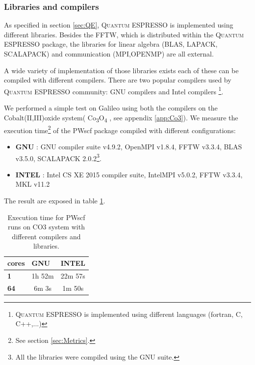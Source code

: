 \documentclass[a4paper,12pt]{article}
\newcommand\QE{\textsc{Quantum} ESPRESSO }
\newcommand\CO{Co\textsubscript{3}O\textsubscript{4} }
\begin{document}
\subsubsection{Libraries and compilers}

As specified in section \ref{sec:QE}, \QE is implemented using different libraries. 
Besides the FFTW, which is distributed within the \QE package, the libraries for linear algebra (BLAS, LAPACK, SCALAPACK) and communication (MPI,OPENMP) are all external.

A wide variety of implementation of those libraries exists each of these can be compiled with different compilers.
There are two popular compilers used by \QE community: GNU compilers and Intel compilers \footnote{\QE is implemented using different languages (fortran, C, C++,...) }.

We performed a simple test on Galileo using both the compilers on the Cobalt(II,III)oxide system( \CO, see appendix \ref{app:Co3}). 
We measure the execution time\footnote{See section \ref{sec:Metrics}.} of the PWscf package compiled with different configurations: 
\begin{itemize}
	\item \textbf{GNU} : GNU compiler suite v4.9.2, OpenMPI v1.8.4, FFTW v3.3.4, BLAS v3.5.0, SCALAPACK 2.0.2\footnote{ All the libraries were compiled using the GNU suite.}.
	\item \textbf{INTEL} : Intel CS XE 2015 compiler suite, IntelMPI v5.0.2,  FFTW v3.3.4, MKL v11.2
\end{itemize}
The result are exposed in table \ref{tab:libraries}.

\begin{table}[h]
\centering
\begin{tabular}{lcc}
\textbf{cores} & \multicolumn{1}{l}{\textbf{GNU}}  & \multicolumn{1}{l}{\textbf{INTEL}} \\ \hline \hline
\textbf{1}     & 1h 52m                            & 22m 57s                            \\
\textbf{64}    & 6m 3s                            		& 1m 50s                            
\end{tabular}
\caption{Execution time for PWscf runs on CO3 system with different compilers and libraries.}
\label{tab:libraries}
\end{table}
\end{document}
